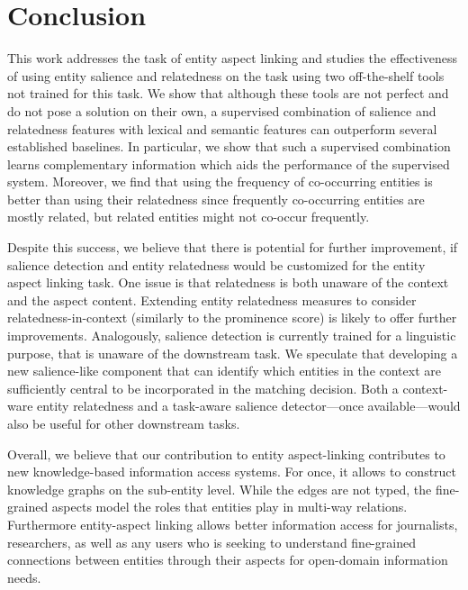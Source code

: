 \section{Conclusion}
\label{sec:Conclusion}
This work addresses the task of entity aspect linking and studies the effectiveness of using entity salience and relatedness on the task using two off-the-shelf tools not trained for this task. We show that although these tools are not perfect and do not pose a solution on their own, a supervised combination of salience and relatedness features with lexical and semantic features can outperform several established baselines. In particular, we show that such a supervised combination learns complementary information which aids the performance of the supervised system. Moreover, we find that using the frequency of co-occurring entities is better than using their relatedness since frequently co-occurring entities are mostly related, but related entities might not co-occur frequently. 

Despite this success, we believe that there is potential for further improvement, if salience detection and entity relatedness would be customized for the entity aspect linking task. One issue is that relatedness is both unaware of the context and the aspect content. Extending entity relatedness measures to consider relatedness-in-context (similarly to the prominence score) is likely to offer further improvements. Analogously, salience detection is currently trained for a linguistic purpose, that is unaware of the downstream task. We speculate that developing a new salience-like component that can identify which entities in the context are sufficiently central to be incorporated in the matching decision. Both a context-ware entity relatedness and a task-aware salience detector---once available---would also be useful for other downstream tasks.

Overall, we believe that our contribution to entity aspect-linking contributes to new knowledge-based information access systems. For once, it allows to construct knowledge graphs on the sub-entity level. While the edges are not typed, the fine-grained aspects model the roles that entities play in multi-way relations. Furthermore entity-aspect linking allows better information access for journalists, researchers, as well as any users who is seeking to understand fine-grained connections between entities through their aspects for open-domain information needs.